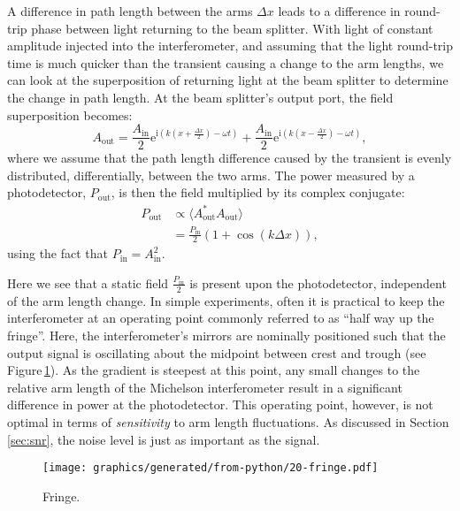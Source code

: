 A difference in path length between the arms $\Delta x$ leads to a difference in round-trip phase between light returning to the beam splitter. With light of constant amplitude injected into the interferometer, and assuming that the light round-trip time is much quicker than the transient causing a change to the arm lengths, we can look at the superposition of returning light at the beam splitter to determine the change in path length. At the beam splitter's output port, the field superposition becomes:
\begin{equation}
  A_{\text{out}} = \frac{A_{\text{in}}}{2} \text{e}^{\text{i} \left( k \left( x + \frac{\Delta x}{2} \right) - \omega t \right)} + \frac{A_{\text{in}}}{2} \text{e}^{\text{i} \left( k \left( x - \frac{\Delta x}{2} \right) - \omega t \right)},
\end{equation}
where we assume that the path length difference caused by the transient is evenly distributed, differentially, between the two arms. The power measured by a photodetector, $P_{\text{out}}$, is then the field multiplied by its complex conjugate:
\begin{equation}
  \label{eq:mich-p-out}
  \begin{split}
    P_{\text{out}} &\propto \langle A_{\text{out}}^*A_{\text{out}} \rangle \\
                   &= \frac{P_{\text{in}}}{2} \left( 1 + \cos \left( k \Delta x \right) \right),
  \end{split}
\end{equation}
using the fact that $P_{\text{in}} = A_{\text{in}}^2$.

Here we see that a static field $\frac{P_{\text{in}}}{2}$ is present upon the photodetector, independent of the arm length change. In simple experiments, often it is practical to keep the interferometer at an operating point commonly referred to as ``half way up the fringe''. Here, the interferometer's mirrors are nominally positioned such that the output signal is oscillating about the midpoint between crest and trough (see Figure\,\ref{fig:fringe}). As the gradient is steepest at this point, any small changes to the relative arm length of the Michelson interferometer result in a significant difference in power at the photodetector. This operating point, however, is not optimal in terms of \emph{sensitivity} to arm length fluctuations. As discussed in Section\,\ref{sec:snr}, the noise level is just as important as the signal.

\begin{figure}
  \centering
  \texttt{[image: graphics/generated/from-python/20-fringe.pdf]}
  \caption[Fringe]{\label{fig:fringe}Fringe.}
\end{figure}


